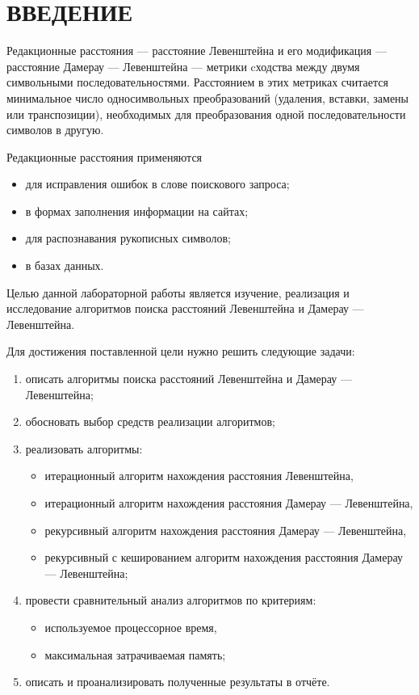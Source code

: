 \section*{ВВЕДЕНИЕ}

Редакционные расстояния --- расстояние Левенштейна и его модификация --- расстояние Дамерау --- Левенштейна --- метрики cходства между двумя символьными последовательностями.
Расстоянием в этих метриках считается минимальное число односимвольных преобразований (удаления, вставки, замены или транспозиции), необходимых для преобразования одной последовательности символов в другую.

Редакционные расстояния применяются 
\begin{itemize}
    \item для исправления ошибок в слове поискового запроса;
    \item в формах заполнения информации на сайтах;
    \item для распознавания рукописных символов;
    \item в базах данных. \cite{ldla}
\end{itemize}

Целью данной лабораторной работы является изучение, реализация и исследование алгоритмов поиска расстояний Левенштейна и Дамерау --- Левенштейна.

Для достижения поставленной цели нужно решить следующие задачи:
\begin{enumerate}
    \item описать алгоритмы поиска расстояний Левенштейна и Дамерау --- Левенштейна;
    \item обосновать выбор средств реализации алгоритмов;
    \item реализовать алгоритмы:
        \begin{itemize}[leftmargin=*]
            \item итерационный алгоритм нахождения расстояния Левенштейна,
            \item итерационный алгоритм нахождения расстояния Дамерау --- Левенштейна,
            \item рекурсивный алгоритм нахождения расстояния Дамерау --- Левенштейна,
            \item рекурсивный с кешированием алгоритм нахождения расстояния Дамерау --- Левенштейна;
        \end{itemize}
    \item провести сравнительный анализ алгоритмов по критериям:
        \begin{itemize}[leftmargin=*]
            \item используемое процессорное время,
            \item максимальная затрачиваемая память;
        \end{itemize}
    \item описать и проанализировать полученные результаты в отчёте.
\end{enumerate} %
